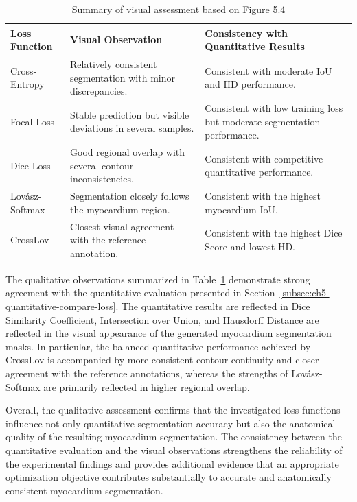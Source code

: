 \begin{table}[htbp]
	\centering
	\caption{Summary of visual assessment based on Figure 5.4}
	\label{tab:ch5-visual-assessment}
	
	\small
	\setlength{\heavyrulewidth}{\lightrulewidth}
	\renewcommand{\arraystretch}{1.3}
	\begin{tabularx}{\textwidth}{
			>{\raggedright\arraybackslash}p{}
			>{\raggedright\arraybackslash}X
			>{\raggedright\arraybackslash}X
		}
		\toprule
		\textbf{Loss Function} & \textbf{Visual Observation} & \textbf{Consistency with Quantitative Results} \\
		\midrule
		Cross-Entropy & Relatively consistent segmentation with minor discrepancies. & Consistent with moderate IoU and HD performance. \\ \addlinespace
		Focal Loss & Stable prediction but visible deviations in several samples. & Consistent with low training loss but moderate segmentation performance. \\ \addlinespace
		Dice Loss & Good regional overlap with several contour inconsistencies. & Consistent with competitive quantitative performance. \\ \addlinespace
		Lov\'asz-Softmax & Segmentation closely follows the myocardium region. & Consistent with the highest myocardium IoU. \\ \addlinespace
		CrossLov & Closest visual agreement with the reference annotation. & Consistent with the highest Dice Score and lowest HD. \\
		\bottomrule
	\end{tabularx}
\end{table}

The qualitative observations summarized in Table~\ref{tab:ch5-visual-assessment} demonstrate strong agreement with the quantitative evaluation presented in Section~\ref{subsec:ch5-quantitative-compare-loss}. The quantitative results are reflected in Dice Similarity Coefficient, Intersection over Union, and Hausdorff Distance are reflected in the visual appearance of the generated myocardium segmentation masks. In particular, the balanced quantitative performance achieved by CrossLov is accompanied by more consistent contour continuity and closer agreement with the reference annotations, whereas the strengths of Lovász-Softmax are primarily reflected in higher regional overlap.

Overall, the qualitative assessment confirms that the investigated loss functions influence not only quantitative segmentation accuracy but also the anatomical quality of the resulting myocardium segmentation. The consistency between the quantitative evaluation and the visual observations strengthens the reliability of the experimental findings and provides additional evidence that an appropriate optimization objective contributes substantially to accurate and anatomically consistent myocardium segmentation.


